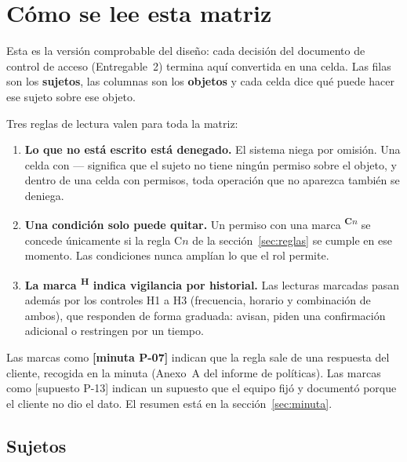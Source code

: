 \documentclass[11pt,letterpaper]{article}
\newcommand{\resp}[1]{\textrm{\footnotesize\bfseries [minuta #1]}}
\newcommand{\supu}[1]{\textrm{\footnotesize [supuesto #1]}}
\newcommand{\cnd}[1]{\textsuperscript{\rmfamily\bfseries #1}}   %
\begin{document}
\section{Cómo se lee esta matriz}

Esta es la versión comprobable del diseño: cada decisión del documento de control de acceso
(Entregable~2) termina aquí convertida en una celda. Las filas son los
\textbf{sujetos}, las columnas son los \textbf{objetos} y cada celda dice qué puede hacer ese sujeto
sobre ese objeto.

Tres reglas de lectura valen para toda la matriz:

\begin{enumerate}
\item \textbf{Lo que no está escrito está denegado.} El sistema niega por omisión. Una celda con
      --- significa que el sujeto no tiene ningún permiso sobre el objeto, y
      dentro de una celda con permisos, toda operación que no aparezca también se deniega.
\item \textbf{Una condición solo puede quitar.} Un permiso con una marca \cnd{C$n$} se concede
      únicamente si la regla C$n$ de la sección~\ref{sec:reglas} se cumple en ese momento. Las
      condiciones nunca amplían lo que el rol permite.
\item \textbf{La marca \cnd{H} indica vigilancia por historial.} Las lecturas marcadas pasan además por los
      controles H1 a H3 (frecuencia, horario y combinación de ambos), que responden de forma graduada:
      avisan, piden una confirmación adicional o restringen por un tiempo.
\end{enumerate}

Las marcas como \resp{P-07} indican que la regla sale de una respuesta del cliente, recogida en la
minuta (Anexo~A del informe de políticas). Las marcas como \supu{P-13} indican un supuesto que el
equipo fijó y documentó porque el cliente no dio el dato. El resumen está en la sección~\ref{sec:minuta}.

\subsection{Sujetos}
\end{document}
